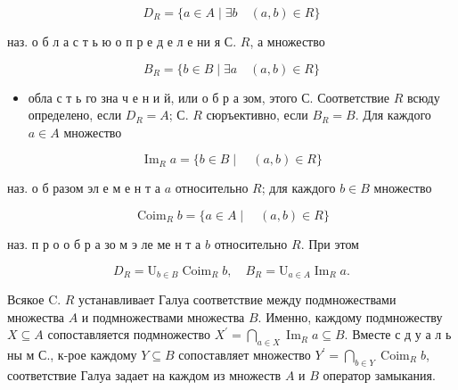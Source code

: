 \documentclass[10pt]{article}
\begin{document}
\[

D_{R}=\{a \in A \mid \exists b \quad(a, b) \in R\}

\]



наз. о б л а с т ь ю о п р е д е л е ни я С. $R$, а множество



\[

B_{R}=\{b \in B \mid \exists a \quad(a, b) \in R\}

\]



\begin{itemize}

  \item обла с т ь го зна ч е н и й, или о б р а зом, этого С. Соответствие $R$ всюду определено, если $D_{R}=A$; С. $R$ сюръективно, если $B_{R}=B$. Для каждого $a \in A$ множество

\end{itemize}



\[

\operatorname{Im}_{R} a=\{b \in B \mid \quad(a, b) \in R\}

\]



наз. о б разом эл е м е н т а $a$ относительно $R$; для каждого $b \in B$ множество



\[

\operatorname{Coim}_{R} b=\{a \in A \mid \quad(a, b) \in R\}

\]



наз. п р о о б р а зо м э ле ме н т а $b$ относительно $R$. При этом



\[

D_{R}=\mathrm{U}_{b \in B} \operatorname{Coim}_{R} b, \quad B_{R}=\mathrm{U}_{a \in A} \operatorname{Im}_{R} a .

\]



Всякое C. $R$ устанавливает Галуа соответствие между подмножествами множества $A$ и подмножествами множества $B$. Именно, каждому подмножеству $X \subseteq A$ сопоставляется подмножество $X^{\prime}=\bigcap_{a \in X} \operatorname{Im}_{R} a \subseteq B$. Вместе с д у а л ь ны м С., к-рое каждому $Y \subseteq B$ сопоставляет множество $Y^{\prime}=\bigcap_{b \in Y} \operatorname{Coim}_{R} b$, соответствие Галуа задает на каждом из множеств $A$ и $B$ оператор замыкания.
\end{document}
